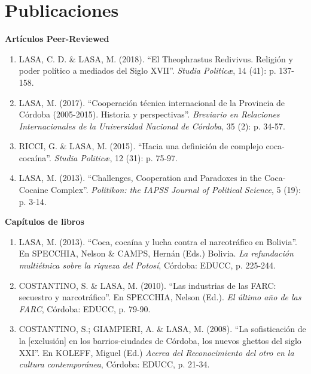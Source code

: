 \documentclass[12pt]{article}
\begin{document}
\section*{Publicaciones}

\begin{rSection}

{\bf Artículos Peer-Reviewed}

\end{rSection}

\begin{enumerate}

\item  LASA, C. D. \& LASA, M. (2018). “El Theophrastus Redivivus. Religión y poder político a mediados del Siglo XVII”. {\it Studia Politic\ae}, 14 (41): p. 137-158.

\item  LASA, M. (2017). “Cooperación técnica internacional de la Provincia de Córdoba (2005-2015). Historia y perspectivas”. {\it Breviario en Relaciones Internacionales de la Universidad Nacional de Córdoba}, 35 (2): p. 34-57.

\item  RICCI, G. \& LASA, M. (2015). “Hacia una definición de complejo coca-cocaína”. {\it Studia Politic\ae}, 12 (31): p. 75-97.

\item  LASA, M. (2013). “Challenges, Cooperation and Paradoxes in the Coca-Cocaine Complex”. {\it Politikon: the IAPSS Journal of Political Science}, 5 (19): p. 3-14.

\end{enumerate}

\begin{rSection}

{\bf Capítulos de libros}

\end{rSection}

\begin{enumerate}

\item  LASA, M. (2013). “Coca, cocaína y lucha contra el narcotráfico en Bolivia”. En SPECCHIA, Nelson \& CAMPS, Hernán (Eds.) Bolivia. {\it La refundación multiétnica sobre la riqueza del Potosí}, Córdoba: EDUCC, p. 225-244.

\item  COSTANTINO, S. \& LASA, M. (2010). “Las industrias de las FARC: secuestro y narcotráfico”. En SPECCHIA, Nelson (Ed.). {\it El último año de las FARC}, Córdoba: EDUCC, p. 79-90. 

\item  COSTANTINO, S.; GIAMPIERI, A. \& LASA, M. (2008). “La sofisticación de la [exclusión] en los barrios-ciudades de Córdoba, los nuevos ghettos del siglo XXI”. En KOLEFF, Miguel (Ed.) {\it Acerca del Reconocimiento del otro en la cultura contemporánea}, Córdoba: EDUCC, p. 21-34.

\end{enumerate}
\end{document}
